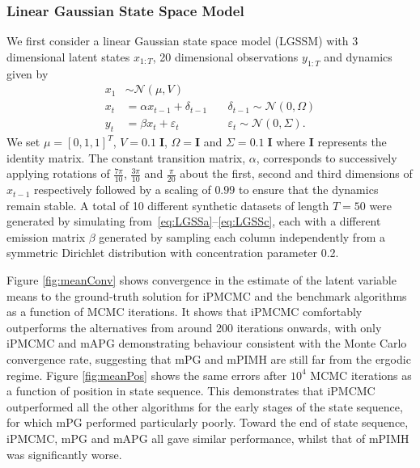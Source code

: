 \subsubsection{Linear Gaussian State Space Model}
\label{sec:LGSS}
We first consider a linear Gaussian state space model (LGSSM) with 3 dimensional latent states $x_{1:T}$, 20 dimensional observations $y_{1:T}$ and dynamics given by %
\begin{subequations}
	\label{eq:LGSS}
	\begin{align}
	x_1 & \sim \mathcal{N} \left(\mu, V\right) \label{eq:LGSSa}\\
	x_t & = \alpha x_{t-1} + \delta_{t-1} \quad & \delta_{t-1} \sim \mathcal{N} \left(0, \Omega\right) \label{eq:LGSSb}\\
	y_t & = \beta x_{t} + \varepsilon_{t} \quad & \varepsilon_{t} \sim \mathcal{N} \left(0, \Sigma\right).
	\label{eq:LGSSc}
	\end{align}
\end{subequations}
We set $\mu = [0, 1, 1]^T$, $V = 0.1 \; \mathbf{I}$, $\Omega = \mathbf{I}$ and $\Sigma = 0.1 \; \mathbf{I}$ where $\mathbf{I}$ represents the identity matrix.  The constant transition matrix, $\alpha$, corresponds to successively applying rotations of $\frac{7\pi}{10}$, $\frac{3\pi}{10}$ and $\frac{\pi}{20}$ about the first, second and third dimensions of $x_{t-1}$ respectively followed by a scaling of $0.99$ to ensure that the dynamics remain stable.  A total of 10 different synthetic datasets of length $T=50$ were generated by simulating from~\eqref{eq:LGSSa}--\eqref{eq:LGSSc}, each with a different emission matrix $\beta$ generated by sampling each column independently from a symmetric Dirichlet distribution with concentration parameter 0.2.

Figure \ref{fig:meanConv} shows convergence in the estimate of the latent variable means to the ground-truth solution for iPMCMC and the benchmark algorithms as a function of MCMC iterations.  It shows that iPMCMC comfortably outperforms the alternatives from around 200 iterations onwards, with only iPMCMC and mAPG demonstrating behaviour consistent with the Monte Carlo convergence rate, suggesting that mPG and mPIMH are still far from the ergodic regime.  Figure \ref{fig:meanPos} shows the same errors after $10^4$ MCMC iterations as a function of position in state sequence.  This demonstrates that iPMCMC outperformed all the other algorithms for the early stages of the state sequence, for which mPG performed particularly poorly. Toward the end of state sequence, iPMCMC, mPG and mAPG all gave similar performance, whilst that of mPIMH was significantly worse.


